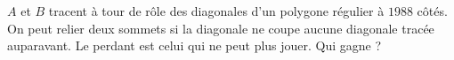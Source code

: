 $A$ et $B$ tracent à tour de rôle des diagonales d'un polygone régulier à $1988$ côtés. On peut relier deux sommets si la diagonale ne coupe aucune diagonale tracée auparavant. Le perdant est celui qui ne peut plus jouer. Qui gagne ?
